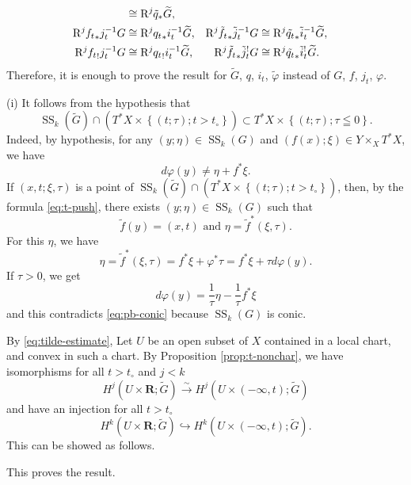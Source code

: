 ﻿\documentclass[a4paper,leqno]{jsarticle}
\makeatletter
\theoremstyle{definition}
\newcommand{\rr}{\mathbf{R}}
\renewenvironment{proof}[1][\proofname]{\par
  \pushQED{\qed}%
  \normalfont \topsep6\p@\@plus6\p@\relax
  \trivlist
  \item[\hskip\labelsep
         \bfseries
    {#1}]\ignorespaces
}{%
  \popQED\endtrivlist\@endpefalse
}
\renewcommand{\proofname}{Proof.}
\numberwithin{equation}{section}
\newcommand{\muS}[1][]{\mathop{\mathrm{SS}}\nolimits_{#1}}
\newcommand{\Rder}[1][]{\mathop{\mathrm{R}^{#1}\hspace{-2pt}}\nolimits}
\newcommand{\simar}{\mathrel{\overset{\sim}{\rightarrow}}}%
\newcommand{\tpb}[1][]{\mathbin{\mathop{\times}\nolimits_{#1}}}
\theoremstyle{mystyle}
\newcommand{\cotb}[1][]{T^{\ast}{#1}}
\makeatother
\begin{document}
\begin{proof}
\begin{align*}
    &\cong 
    \Rder[j]{\tilde{q}_{\ast}}\widetilde{G},
    \\
    \Rder[j]{{f_{t}}_{\ast}}j_{t}^{-1}G
    &\cong 
    \Rder[j]{{q_{t}}_{\ast}}i_{t}^{-1}\widetilde{G},
    &
    \Rder[j]{\tilde{f_{t}}_{\ast}}\tilde{j}_{t}^{-1}G
    &\cong 
    \Rder[j]{\tilde{q_{t}}_{\ast}}\tilde{i}_{t}^{-1}\widetilde{G},
    \\
    \Rder[j]{{f_{t}}_{!}}j_{t}^{-1}G
    &\cong 
    \Rder[j]{{q_{t}}_{!}}i_{t}^{-1}\widetilde{G},
    &
    \Rder[j]{\tilde{f_{t}}_{\ast}}\tilde{j}_{t}^{!}G
    &\cong 
    \Rder[j]{\tilde{q_{t}}_{\ast}}\tilde{i}_{t}^{!}\widetilde{G}.    
  \end{align*}
  Therefore, it is enough to prove the result for \(\widetilde{G}\), \(q\), \(i_t\), \(\tilde{\varphi}\) instead of \(G\), \(f\), \(j_t\), \(\varphi\). 

  (i) 
  It follows from the hypothesis that\begin{equation}\label{eq:tilde-estimate}
    \muS[k](\widetilde{G})\cap\left(
      \cotb[X]\times\left\{(t;\tau);t>t_{\circ}\right\}
    \right)
    \subset
    \cotb[X]\times\left\{(t;\tau);\tau\leqq0\right\}.
  \end{equation}
  Indeed, by hypothesis, 
  for any \((y;\eta)\in\muS[k](G)\) 
  and \((f(x);\xi)\in Y\tpb[X]\cotb[X]\), 
  we have \begin{equation}\label{eq:pb-conic}
    d\varphi(y)\neq \eta + f^{\ast}\xi.
  \end{equation}
  If \((x,t;\xi,\tau)\) is a point of \(
    \muS[k](\widetilde{G})\cap\left(
      \cotb[X]\times\left\{(t;\tau);t>t_{\circ}\right\}
  \right)\), 
  then, by the formula \eqref{eq:t-push}, 
  there exists \((y;\eta)\in\muS[k](G)\) such that \[
    \tilde{f}(y)=(x,t) 
    \text{ and } 
    \eta=\tilde{f}^{\ast}(\xi,\tau).
  \] For this \(\eta\), we have \[
    \eta
    =\tilde{f}^{\ast}(\xi,\tau)
    =f^{\ast}\xi +\varphi^{\ast}\tau
    =f^{\ast}\xi +\tau d\varphi(y).
  \]
  If \(\tau>0\), we get \[
    d\varphi(y)=\frac{1}{\tau}\eta-\frac{1}{\tau}f^{\ast}\xi
  \] and this contradicts \eqref{eq:pb-conic} 
  because \(\muS[k](G)\) is conic. 

  By \eqref{eq:tilde-estimate}, 
  Let \(U\) be an open subset of \(X\) contained 
  in a local chart, and convex in such a chart. 
  By Proposition \ref{prop:t-nonchar}, we have isomorphisms 
  for all \(t>t_{\circ}\) and \(j<k\)
  \begin{equation}
    H^{j}(U\times\rr;\widetilde{G})
    \simar
    H^{j}(U\times\left(-\infty,t\right);\widetilde{G})
  \end{equation}
  and have an injection 
  for all \(t>t_{\circ}\) 
  \begin{equation}
    H^{k}(U\times\rr;\widetilde{G})
    \hookrightarrow
    H^{k}(U\times\left(-\infty,t\right);\widetilde{G}).
  \end{equation}
  This can be showed as follows.

  This proves the result. 
\end{proof}
\end{document}

